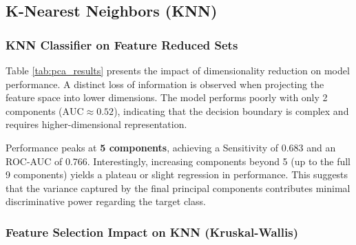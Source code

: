 \documentclass[12pt,a4paper]{article}
\begin{document}
\subsection{K-Nearest Neighbors (KNN)}
\subsubsection*{KNN Classifier on Feature Reduced Sets}

Table \ref{tab:pca_results} presents the impact of dimensionality reduction on model performance. A distinct loss of information is observed when projecting the feature space into lower dimensions. The model performs poorly with only 2 components ($\text{AUC} \approx 0.52$), indicating that the decision boundary is complex and requires higher-dimensional representation.

Performance peaks at \textbf{5 components}, achieving a Sensitivity of 0.683 and an ROC-AUC of 0.766. Interestingly, increasing components beyond 5 (up to the full 9 components) yields a plateau or slight regression in performance. This suggests that the variance captured by the final principal components contributes minimal discriminative power regarding the target class.

\begin{table}[htbp]
\centering

\caption{Performance metrics for KNN ($k=5$, Manhattan, Distance) using PCA for dimensionality reduction.}
\label{tab:pca_results}
\end{table}


\subsubsection*{Feature Selection Impact on KNN (Kruskal-Wallis)}
\end{document}
